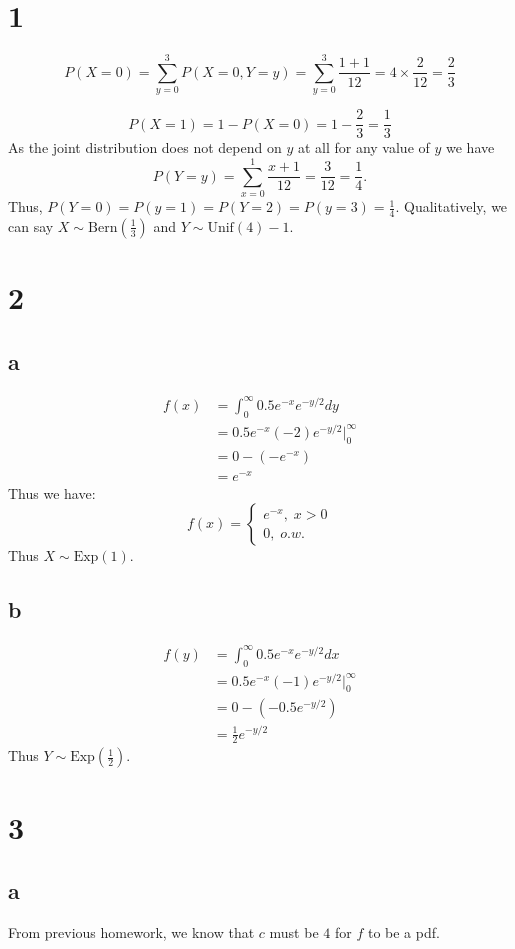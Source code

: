 \documentclass[10pt]{article}
\begin{document}
\section*{1}
\[P(X=0)=\sum_{y=0}^3P(X=0,Y=y)=\sum_{y=0}^3\frac{1+1}{12}=4\times\frac{2}{12}=\frac{2}{3}\]

\[P(X=1)=1-P(X=0)=1-\frac{2}{3}=\frac{1}{3}\]
As the joint distribution does not depend on $y$ at all for any value of $y$ we have
\[P(Y=y)=\sum_{x=0}^1\frac{x+1}{12}=\frac{3}{12}=\frac{1}{4}.\]
Thus, $P(Y=0)=P(y=1)=P(Y=2)=P(y=3)=\frac{1}{4}.$ Qualitatively, we can say $X\sim\text{Bern}(\frac{1}{3})$ and $Y\sim\text{Unif}(4)-1.$

\section*{2}
\subsection*{a}
\begin{align*}
    f(x) &= \int_0^\infty 0.5e^{-x}e^{-y/2}dy\\
    &=0.5e^{-x}(-2)e^{-y/2}\Bigr |_0^\infty\\
    &=0 - (-e^{-x})\\
    &= e^{-x}
\end{align*}
Thus we have:
\begin{equation*}
    f(x)=\begin{cases}
        e^{-x},\; x>0\\
        0,\; o.w.
    \end{cases}
\end{equation*}
Thus $X\sim\text{Exp}(1).$
\subsection*{b}
\begin{align*}
    f(y) &= \int_0^\infty 0.5e^{-x}e^{-y/2}dx\\
    &=0.5e^{-x}(-1)e^{-y/2}\Bigr |_0^\infty\\
    &=0 - (-0.5e^{-y/2})\\
    &= \frac{1}{2}e^{-y/2}
\end{align*}
Thus $Y\sim\text{Exp}(\frac{1}{2}).$

\section*{3}
\subsection*{a}
From previous homework, we know that $c$ must be $4$ for $f$ to be a pdf.
\end{document}
